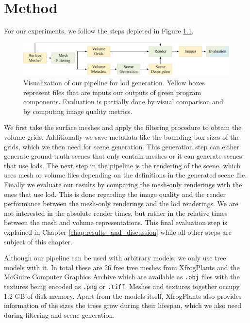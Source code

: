 \chapter{Method}
\label{chap:method}
For our experiments, we follow the steps depicted in Figure \ref{fig:pipeline}.
\begin{figure}[ht]
    \centering
    \includegraphics[width=1.0\linewidth]{img/pipeline.png}
    \caption[Visualization of the pipeline the thesis built upon]{Visualization of our pipeline for \ac{lod} generation. Yellow boxes represent files that are inputs our outputs of green program components. Evaluation is partially done by visual comparison and by computing image quality metrics.}
    \label{fig:pipeline}
\end{figure}
We first take the surface meshes and apply the filtering procedure to obtain the volume grids.
Additionally we save metadata like the bounding-box sizes of the grids, which we then need for scene generation.
This generation step can either generate ground-truth scenes that only contain meshes or it can generate scenes that use \acp{lod}.
The next step in the pipeline is the rendering of the scene, which uses mesh or volume files depending on the definitions in the generated scene file.
Finally we evaluate our results by comparing the mesh-only renderings with the ones that use \ac{lod}.
This is done regarding the image quality and the render performance between the mesh-only renderings and the \ac{lod} renderings.
We are not interested in the absolute render times, but rather in the relative times between the mesh and volume representations.
This final evaluation step is explained in Chapter \ref{chap:results_and_discussion} while all other steps are subject of this chapter.

Although our pipeline can be used with arbitrary models, we only use tree models with it.
In total these are 26 free tree meshes from XfrogPlants \cite{xfrogplants} and the McGuire Computer Graphics Archive \cite{McGuire2017Data} which are available as \texttt{.obj} files with the textures being encoded as \texttt{.png} or \texttt{.tiff}.
Meshes and textures together occupy 1.2 GB of disk memory.
Apart from the models itself, XfrogPlants also provides information of the sizes the trees grow during their lifespan, which we also need during filtering and scene generation.

